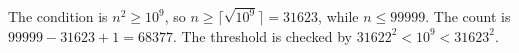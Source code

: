 The condition is $n^2\ge10^9$, so $n\ge\lceil\sqrt{10^9}\rceil=31623$, while $n\le99999$. The count is $99999-31623+1=\boxed{68377}$. The threshold is checked by $31622^2<10^9<31623^2$.
